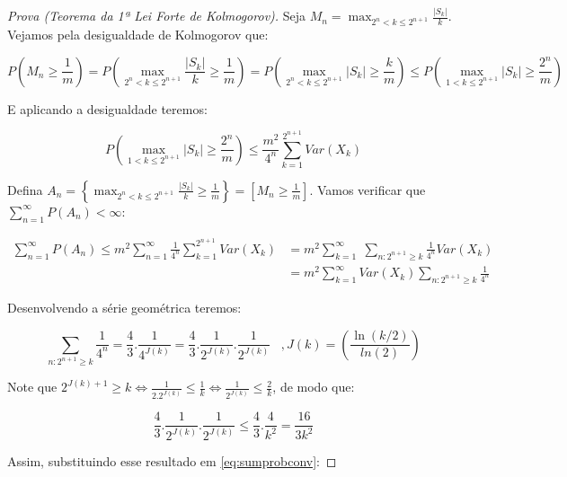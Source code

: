 \documentclass[
]{article}
\theoremstyle{definition}
\theoremstyle{definition}
\theoremstyle{definition}
\theoremstyle{definition}
\theoremstyle{remark}
\begin{document}
\begin{proof}[Prova (Teorema da 1ª Lei Forte de Kolmogorov)]
Seja \(M_{n} = \max_{2^{n} < k \le 2^{n+1}}\frac{|S_{k}|}{k}\). Vejamos pela desigualdade de Kolmogorov que:

\begin{equation*}
P(M_{n} \ge \frac{1}{m}) = P\left(\max_{2^{n} < k \le 2^{n+1}}\frac{|S_{k}|}{k} \ge \frac{1}{m}\right) = P\left(\max_{2^{n} < k \le 2^{n+1}}|S_{k}| \ge \frac{k}{m}\right) \le P\left(\max_{1 < k \le 2^{n+1}}|S_{k}| \ge \frac{2^{n}}{m}\right)
\end{equation*}

E aplicando a desigualdade teremos:

\begin{equation*}
P\left(\max_{1 < k \le 2^{n+1}}|S_{k}| \ge \frac{2^{n}}{m}\right) \le \frac{m^{2}}{4^{n}}\sum_{k=1}^{2^{n+1}}Var(X_{k})
\end{equation*}

Defina \(A_{n} = \left\{\max_{2^{n} < k \le 2^{n+1}}\frac{|S_{k}|}{k} \ge \frac{1}{m}\right\} = \left[M_{n} \ge \frac{1}{m}\right]\). Vamos verificar que \(\sum_{n=1}^{\infty}P(A_{n}) < \infty\):

\begin{align}
\sum_{n=1}^{\infty}P(A_{n}) \le m^{2}\sum_{n=1}^{\infty}\frac{1}{4^{n}}\sum_{k=1}^{2^{n+1}}Var(X_{k}) &= m^{2}\sum_{k=1}^{\infty}\;\sum_{n:2^{n+1} \ge k}\frac{1}{4^{n}}Var(X_{k})  \nonumber \\
&= m^{2}\sum_{k=1}^{\infty}Var(X_{k})\sum_{n:2^{n+1} \ge k}\frac{1}{4^{n}}
\label{eq:sumprobconv}
\end{align}

Desenvolvendo a série geométrica teremos:

\begin{equation*}
\sum_{n:2^{n+1} \ge k}\frac{1}{4^{n}} = \frac{4}{3}.\frac{1}{4^{J(k)}} = \frac{4}{3}.\frac{1}{2^{J(k)}}.\frac{1}{2^{J(k)}}\;\;\; , J(k) = \left(\frac{\ln(k/2)}{ln(2)}\right)
\end{equation*}

Note que \(2^{J(k) + 1} \ge k \Leftrightarrow \frac{1}{2.2^{J(k)}} \le \frac{1}{k} \Leftrightarrow \frac{1}{2^{J(k)}} \le \frac{2}{k}\), de modo que:

\begin{equation*}
\frac{4}{3}.\frac{1}{2^{J(k)}}.\frac{1}{2^{J(k)}} \le \frac{4}{3}.\frac{4}{k^{2}} = \frac{16}{3k^{2}}
\end{equation*}

Assim, substituindo esse resultado em \eqref{eq:sumprobconv}:


\end{proof}
\end{document}
